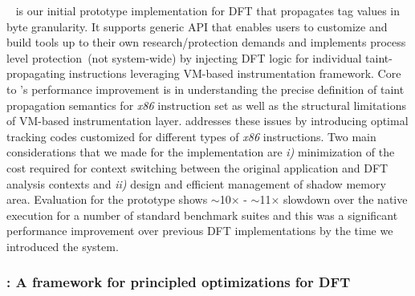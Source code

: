 \documentclass[letterpaper, 10pt]{article}
\begin{document}
\begin{small}
\libdft~\cite{libdft:2012vee} is our initial prototype implementation for DFT
that propagates tag values in byte granularity.
%
It supports generic API that enables users to customize and build tools up to
their own research/protection demands and implements process level
protection~(not system-wide) by injecting DFT logic for individual
taint-propagating instructions leveraging VM-based instrumentation framework.
%
Core to \libdft's performance improvement is in understanding the precise
definition of taint propagation semantics for {\it x86} instruction set as well
as the structural limitations of VM-based instrumentation layer. 
%
\libdft
addresses these issues by introducing optimal tracking codes customized for
different types of {\it x86} instructions. Two main considerations that we made
for the implementation are {\it i)} minimization of the cost required for
context switching between the original application and DFT analysis contexts
and {\it ii)} design and efficient management of shadow memory area.
%
Evaluation for the prototype shows $\sim$10$\times$ - $\sim$11$\times$ slowdown
over the native execution for a number of standard benchmark suites and this
was a significant performance improvement over previous DFT implementations by
the time we introduced the system.

\subsubsection*{\TFA: A framework for principled optimizations for DFT}


\end{small}
\end{document}
